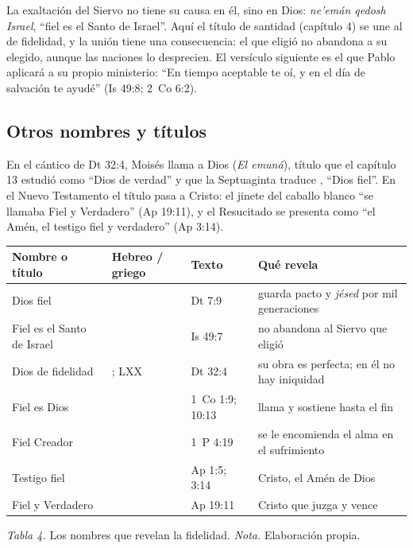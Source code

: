 La exaltación del Siervo no tiene su causa en él, sino en Dios: \emph{ne'emán qedosh Israel}, ``fiel es el Santo de Israel''. Aquí el título de santidad (capítulo 4) se une al de fidelidad, y la unión tiene una consecuencia: el que eligió no abandona a su elegido, aunque las naciones lo desprecien. El versículo siguiente es el que Pablo aplicará a su propio ministerio: ``En tiempo aceptable te oí, y en el día de salvación te ayudé'' (Is 49:8; 2~Co 6:2).

\subsection{Otros nombres y títulos}
En el cántico de Dt 32:4, Moisés llama a Dios  (\emph{El emuná}), título que el capítulo 13 estudió como ``Dios de verdad'' y que la Septuaginta traduce , ``Dios fiel''. En el Nuevo Testamento el título pasa a Cristo: el jinete del caballo blanco ``se llamaba Fiel y Verdadero'' (Ap 19:11), y el Resucitado se presenta como ``el Amén, el testigo fiel y verdadero'' (Ap 3:14).

\begin{center}\small\renewcommand{\arraystretch}{1.22}
\begin{tabular}{@{}L{3.2cm}L{3.6cm}L{2.6cm}L{5.0cm}@{}}
\toprule
\textbf{Nombre o título} & \textbf{Hebreo / griego} & \textbf{Texto} & \textbf{Qué revela} \\ \midrule
Dios fiel &  & Dt 7:9 & guarda pacto y \emph{jésed} por mil generaciones \\
Fiel es el Santo de Israel &  & Is 49:7 & no abandona al Siervo que eligió \\
Dios de fidelidad & ; LXX  & Dt 32:4 & su obra es perfecta; en él no hay iniquidad \\
Fiel es Dios &  & 1~Co 1:9; 10:13 & llama y sostiene hasta el fin \\
Fiel Creador &  & 1~P 4:19 & se le encomienda el alma en el sufrimiento \\
Testigo fiel &  & Ap 1:5; 3:14 & Cristo, el Amén de Dios \\
Fiel y Verdadero &  & Ap 19:11 & Cristo que juzga y vence \\
\bottomrule
\end{tabular}\par
{\footnotesize\color{gris}\textit{Tabla 4.} Los nombres que revelan la fidelidad. \textit{Nota.} Elaboración propia.}
\end{center}


